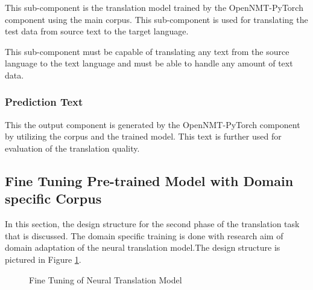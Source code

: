 This sub-component is the translation model trained by the OpenNMT-PyTorch component using the main corpus. This sub-component is used for translating the test data from source text to the target language. 

This sub-component must be capable of translating any text from the source language to the text language and must be able to handle any amount of text data.  

\subsubsection{Prediction Text}

This the output component is generated by the OpenNMT-PyTorch component by utilizing the corpus and the trained model. This text is further used for evaluation of the translation quality.

\subsection{Fine Tuning Pre-trained Model with Domain specific Corpus}
In this section, the design structure for the second phase of the translation task that is discussed. The domain specific training is done with research aim of domain adaptation of the neural translation model.The design structure is pictured in Figure \ref{seq2seq2}.

\begin{figure}[h]
\caption{Fine Tuning of Neural Translation Model} \label{seq2seq2}
\end{figure}


